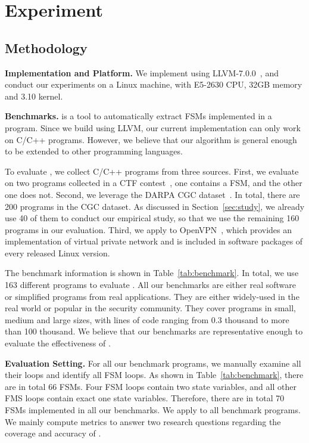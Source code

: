 \section{Experiment}

\subsection{Methodology}

\noindent\textbf{Implementation and Platform.} 
We implement \Tool{} using LLVM-7.0.0~\cite{LLVM}, 
and conduct our experiments on a Linux machine, 
with E5-2630 CPU, 32GB memory and 3.10 kernel. 

\noindent\textbf{Benchmarks.}
\Tool{} is a tool to automatically extract FSMs implemented in a program. 
Since we build \Tool{} using LLVM, 
our current implementation can only work on C/C++ programs.  
However, we believe that our algorithm is general enough 
to be extended to other programming languages. 


To evaluate \Tool{}, we collect C/C++ programs from three sources. 
First, we evaluate \Tool{} on two programs collected in a CTF contest~\cite{ctf}, 
one contains a FSM, and the other one does not. 
Second, we leverage the DARPA CGC dataset~\cite{CGC}. 
In total, there are 200 programs in the CGC dataset.
As discussed in Section~\ref{sec:study}, 
we already use 40 of them to conduct our empirical study,
so that we use the remaining 160 programs in our evaluation.
Third, we apply \Tool{} to OpenVPN~\cite{openvpn}, 
which provides an implementation of virtual private network and 
is included in software packages of every released Linux version. 



The benchmark information is shown in Table~\ref{tab:benchmark}.
In total, we use 163 different programs to evaluate \Tool{}.
All our benchmarks are either real software or 
simplified programs from real applications. 
They are either widely-used in the real world or popular in the security community. 
They cover programs in small, medium and large sizes, 
with lines of code ranging from 0.3 thousand to more than 100 thousand.  
We believe that our benchmarks are representative 
enough to evaluate the effectiveness of \Tool{}.

\noindent\textbf{Evaluation Setting.} 
For all our benchmark programs, we manually examine all their loops and 
identify all FSM loops. 
As shown in Table~\ref{tab:benchmark}, there are in 
total 66 FSMs.
Four FSM loops contain two state variables, 
and all other FMS loops contain exact one state variables.
Therefore, there are in total 70 FSMs implemented in all our benchmarks.  
We apply \Tool{} to all benchmark programs. 
We mainly compute metrics to answer two research 
questions regarding the coverage and accuracy of \Tool{}.


